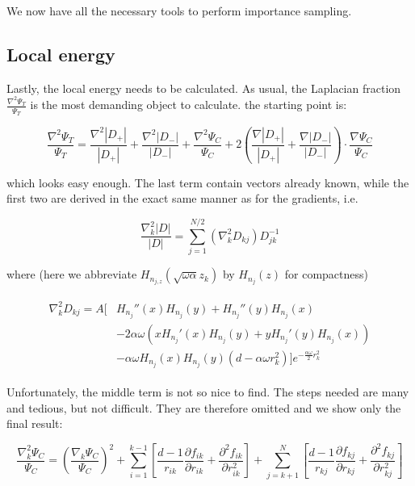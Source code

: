 \documentclass[english, a4paper]{article}
\begin{document}
	We now have all the necessary tools to perform importance sampling.
	
	\subsection{Local energy}
	Lastly, the local energy needs to be calculated. As usual, the Laplacian fraction $\frac{\nabla^2\Psi_T}{\Psi_T}$ is the most demanding object to calculate. the starting point is:
	
	\begin{equation}
	\frac{\nabla^2\Psi_T}{\Psi_T} = \frac{\nabla^2 |D_+|}{|D_+|} + \frac{\nabla^2 |D_-|}{|D_-|} + \frac{\nabla^2 \Psi_C}{\Psi_C} + 2\left( \frac{\nabla |D_+|}{|D_+|} + \frac{\nabla |D_-|}{|D_-|} \right)\cdot\frac{\nabla \Psi_C}{\Psi_C}
	\end{equation}
	
	which looks easy enough. The last term contain vectors already known, while the first two are derived in the exact same manner as for the gradients, i.e.
	
	\begin{equation}
	\frac{\nabla_k^2|D|}{|D|} = \sum_{j=1}^{N/2}(\nabla_k^2D_{kj})D_{jk}^{-1}
	\end{equation}
	
	where (here we abbreviate $H_{n_{j,z}}(\sqrt{\omega\alpha}z_k)$ by $H_{n_j}(z)$ for compactness)
	
	\begin{align}
		\begin{split}
		\nabla_k^2D_{kj} = A\Big[&H_{n_j}''(x)H_{n_j}(y) + H_{n_j}''(y)H_{n_j}(x)\\
		&- 2\alpha\omega\left(xH_{n_j}'(x)H_{n_j}(y) + yH_{n_j}'(y)H_{n_j}(x)\right)\\
		&- \alpha\omega H_{n_j}(x)H_{n_j}(y)\left(d - \alpha\omega r_k^2\right)\Big]e^{-\frac{\alpha\omega}{2}r_k^2}
		\end{split}
	\end{align}
	
	Unfortunately, the middle term is not so nice to find. The steps needed are many and tedious, but not difficult. They are therefore omitted and we show only the final result:
	
	\begin{equation}
	\frac{\nabla_k^2 \Psi_C}{\Psi_C} = \left(\frac{\nabla_k\Psi_C}{\Psi_C}\right)^2 + \sum_{i=1}^{k-1}\left[\frac{d-1}{r_{ik}}\frac{\partial f_{ik}}{\partial r_{ik}} + \frac{\partial^2 f_{ik}}{\partial r_{ik}^2}\right] + \sum_{j=k+1}^{N}\left[\frac{d-1}{r_{kj}}\frac{\partial f_{kj}}{\partial r_{kj}} + \frac{\partial^2 f_{kj}}{\partial r_{kj}^2}\right]
	\end{equation}
	
\end{document}
